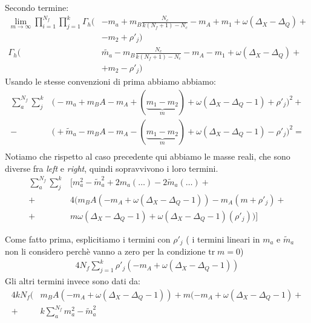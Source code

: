 \documentclass[a4paper,12pt]{article}
\begin{document}
Secondo termine:
\begin{align*}
\lim_{m \rightarrow \infty} \prod_{i=1}^{N_f} \prod_{j=1}^{k } \Gamma_h \big(& - m_a + m_B \frac{N_c}{k(N_f+1)-N_c }- m_A + m_1 + \omega ( \Delta_X - \Delta_Q)+\\
&  - m_2  + \rho'_j \big) \\
\Gamma_h \big( & \tilde{m_a} - m_B \frac{N_c}{k(N_f+1)-N_c }- m_A - m_1 + \omega ( \Delta_X - \Delta_Q) +\\
& + m_2 - \rho'_j \big)
\end{align*}
Usando le stesse convenzioni di prima abbiamo abbiamo: 
\begin{align*}
\sum_a^{N_f} \sum_j^{k} &  \big(  - m_a + m_B A - m_A + (\underbrace{m_1 - m_2}_{m}) + \omega ( \Delta_X - \Delta_Q - 1) + \rho'_j \big)^2 +\\
	- &\big(  + \tilde{m}_a - m_B A - m_A - ( \underbrace{m_1 - m_2}_{m})  + \omega ( \Delta_X - \Delta_Q - 1) - \rho'_j \big)^2 = \\
\end{align*}
Notiamo che rispetto al caso precedente qui abbiamo le masse reali, che sono diverse fra \emph{left} e \emph{right}, quindi sopravvivono i loro termini.
\begin{align*}
\sum_a^{N_f} \sum_j^{k} &  \big[  m_a^2 - \tilde{m}_a^2 + 2 m_a ( \dots )  - 2 \tilde{m	}_a ( \dots) + \\
 + &4 \big( m_B A ( - m_A +  \omega ( \Delta_X - \Delta_Q - 1) ) - m_A ( m + \rho'_j)  + \\
+ &  m\omega ( \Delta_X - \Delta_Q - 1)  + \omega ( \Delta_X - \Delta_Q - 1) ( \rho'_j) \big)\big]
\end{align*}

Come fatto prima, esplicitiamo i termini con $\rho'_j$ ( i termini lineari in $m_a$ e $\tilde{m}_a$ non li considero perchè vanno a zero per la condizione $ \mbox{tr}\; m = 0$)
\begin{align*}
 4 N_f \sum_{j=1}^k  \rho'_j ( - m_A +  \omega ( \Delta_X - \Delta_Q - 1) )
\end{align*}
Gli altri termini invece sono dati da:
\begin{align*}
4 k N_f \big(&  m_B A (- m_A +  \omega ( \Delta_X - \Delta_Q - 1)) + m ( - m_A +  \omega ( \Delta_X - \Delta_Q - 1)+ \\
+ &  k \sum_a^{N_f} m_a^2 - \tilde{m}_a^2
\end{align*}
\end{document}
